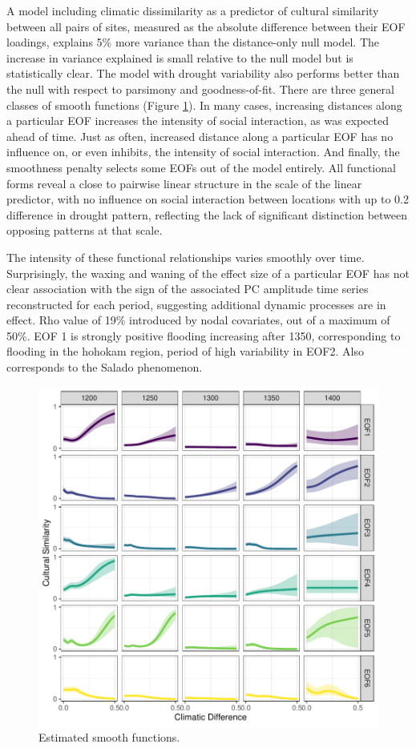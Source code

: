 \documentclass[10pt]{iopart}
\begin{document}
A model including climatic dissimilarity as a predictor of cultural similarity between all pairs of sites, measured as the absolute difference between their EOF loadings, explains 5\% more variance than the distance-only null model. The increase in variance explained is small relative to the null model but is statistically clear. The model with drought variability also performs better than the null with respect to parsimony and goodness-of-fit. There are three general classes of smooth functions (Figure \ref{fig:smooths}). In many cases, increasing distances along a particular EOF increases the intensity of social interaction, as was expected ahead of time. Just as often, increased distance along a particular EOF has no influence on, or even inhibits, the intensity of social interaction. And finally, the smoothness penalty selects some EOFs out of the model entirely. All functional forms reveal a close to pairwise linear structure in the scale of the linear predictor, with no influence on social interaction between locations with up to 0.2 difference in drought pattern, reflecting the lack of significant distinction between opposing patterns at that scale. 

The intensity of these functional relationships varies smoothly over time. Surprisingly, the waxing and waning of the effect size of a particular EOF has not clear association with the sign of the associated PC amplitude time series reconstructed for each period, suggesting additional dynamic processes are in effect. Rho value of 19\% introduced by nodal covariates, out of a maximum of 50\%. EOF 1 is strongly positive flooding increasing after 1350, corresponding to flooding in the hohokam region, period of high variability in EOF2. Also corresponds to the Salado phenomenon.

\begin{figure}[!htbp]
\centering
\includegraphics[width=.8\linewidth]{figures/smooths.pdf}
\caption{Estimated smooth functions.}
\label{fig:smooths}
\end{figure}
\end{document}
